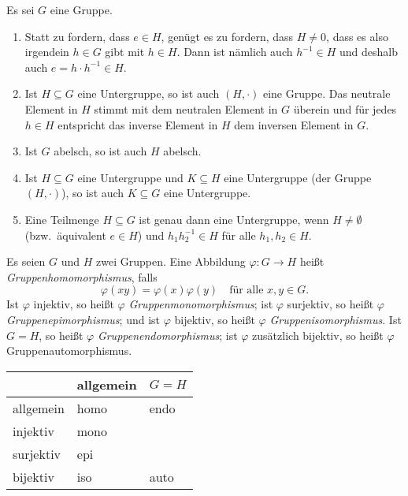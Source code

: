 \begin{bem}
 Es sei $G$ eine Gruppe.
 \begin{enumerate}[leftmargin=*]
  \item
   Statt zu fordern, dass $e \in H$, genügt es zu fordern, dass $H \neq 0$, dass es also irgendein $h \in G$ gibt mit $h \in H$. Dann ist nämlich auch $h^{-1} \in H$ und deshalb auch $e = h \cdot h^{-1} \in H$.
  \item
   Ist $H \subseteq G$ eine Untergruppe, so ist auch $(H, \cdot)$ eine Gruppe. Das neutrale Element in $H$ stimmt mit dem neutralen Element in $G$ überein und für jedes $h \in H$ entspricht das inverse Element in $H$ dem inversen Element in $G$.
  \item
   Ist $G$ abelsch, so ist auch $H$ abelsch.
  \item
   Ist $H \subseteq G$ eine Untergruppe und $K \subseteq H$ eine Untergruppe (der Gruppe $(H,\cdot)$), so ist auch $K \subseteq G$ eine Untergruppe.
  \item
   Eine Teilmenge $H \subseteq G$ ist genau dann eine Untergruppe, wenn $H \neq \emptyset$ (bzw.\ äquivalent $e \in H$) und $h_1 h_2^{-1} \in H$ für alle $h_1, h_2 \in H$.
 \end{enumerate}
\end{bem}


\begin{defi}
 Es seien $G$ und $H$ zwei Gruppen. Eine Abbildung $\varphi \colon G \to H$ heißt \emph{Gruppenhomomorphismus}, falls 
 \[
  \varphi(xy) = \varphi(x)\varphi(y) \quad \text{für alle $x,y \in G$}.
 \]
 Ist $\varphi$ injektiv, so heißt $\varphi$ \emph{Gruppenmonomorphismus}; ist $\varphi$ surjektiv, so heißt $\varphi$ \emph{Gruppenepimorphismus}; und ist $\varphi$ bijektiv, so heißt $\varphi$ \emph{Gruppenisomorphismus}. Ist $G = H$, so heißt $\varphi$ \emph{Gruppenendomorphismus}; ist $\varphi$ zusätzlich bijektiv, so heißt $\varphi$ Gruppenautomorphismus.
\end{defi}


\begin{center}
 \begin{tabular}{l|l|l}
             & allgemein & $G = H$ \\
   \hline
   allgemein & homo      & endo    \\
   injektiv  & mono      &         \\
   surjektiv & epi       &         \\
   bijektiv  & iso       & auto
 \end{tabular}
\end{center}


